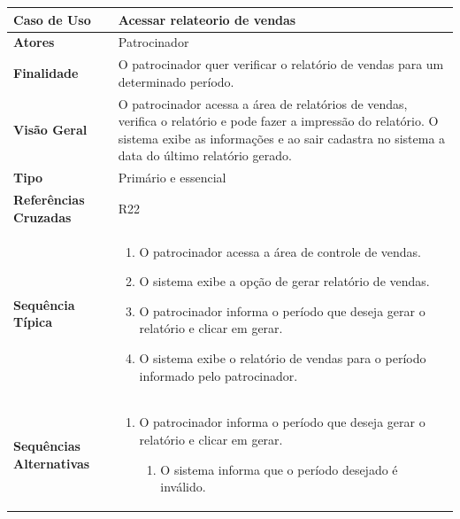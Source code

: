 \documentclass[a4paper,11pt]{article}
\begin{document}
\begin{table}[H]
		\begin{tabularx}{\textwidth}{|l|X|}
		\hline
			\textbf{Caso de Uso} &  Acessar relateorio de vendas \\ \hline
			\textbf{Atores} &   Patrocinador \\ \hline
			\textbf{Finalidade} & O patrocinador quer verificar o relatório de vendas para um determinado período.  \\ \hline
			\textbf{Visão Geral} &  O patrocinador acessa a área de relatórios de vendas, verifica o relatório e pode fazer a impressão do relatório. O sistema exibe as informações e ao sair cadastra no sistema a data do último relatório gerado.  \\ \hline
			\textbf{Tipo} & Primário e essencial \\ \hline
			\textbf{Referências Cruzadas} & R22 \\ \hline
			\textbf{Sequência Típica} & 
			\begin{enumerate}
			\item O patrocinador acessa a área de controle de vendas.
			\item O sistema exibe a opção de gerar relatório de vendas.
			\item O patrocinador informa o período que deseja gerar o relatório e clicar em gerar.
			\item O sistema exibe o relatório de vendas para o período informado pelo patrocinador.
			\end{enumerate} \\ \hline
			\textbf{Sequências Alternativas} & 
			\begin{enumerate}
			\item O patrocinador informa o período que deseja gerar o relatório e clicar em gerar.
			\begin{enumerate}
			\item O sistema informa que o período desejado é inválido.
			\end{enumerate}
			\end{enumerate} \\ \hline
		\end{tabularx}
\end{table}
\end{document}
